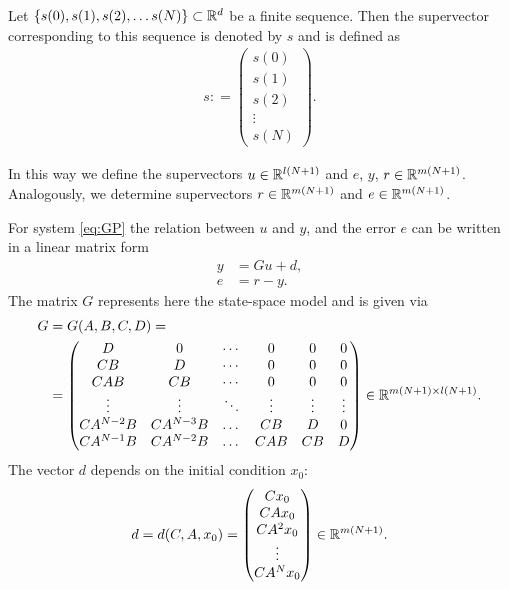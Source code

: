 \begin{defi}
	Let $\{s(0), s(1), s(2), \dots s(N)\} \subset {\mathbb{R}}^{d}$ be a finite sequence. Then the supervector corresponding to this sequence is denoted by $s$ and is defined as 
\begin{align}
s: = \begin{pmatrix}
s(0) \\ s(1) \\ s(2) \\ \vdots \\ s(N)
\end{pmatrix}.
\end{align}
\end{defi}

In this way we define the supervectors $u \in {\mathbb{R}}^{l(N+1)} $ and $e$, $y$, $r \in {\mathbb{R}}^{m(N+1)}$. 
Analogously, we determine supervectors $r\in {\mathbb{R}}^{m(N+1)}$ and $e\in {\mathbb{R}}^{m(N+1)}$. 

For system \eqref{eq:GP} the relation between $u$ and $y$, and the error $e$ can be written in a linear matrix form 
\begin{align}
\label{eq:Gu + d}
y &= Gu + d, \\
e &= r - y.
\end{align}
The matrix $G$ represents here the state-space model and is given via  
\begin{align}
\label{eq:Gmatrix}
\begin{split}
G &= G(A,B,C,D) = \\
&=  \begin{pmatrix}
D & 0 & \cdots & 0 & 0 & 0 \\
CB & D & \cdots & 0 & 0 & 0\\
CAB & CB & \cdots & 0 & 0 & 0\\
\vdots & \vdots & \ddots & \vdots  & \vdots & \vdots \\
CA^{N-2} B & CA^{N-3} B &\dots &CB & D& 0\\
CA^{N-1} B & CA^{N-2} B &\dots &CAB & CB& D\\
\end{pmatrix} \in {\mathbb{R}}^{m(N+1)\times l(N+1)}.
\end{split}
\end{align}
The vector $d$ depends on the initial condition $x_0$:
\begin{align}
d = d(C,A,x_0) = \begin{pmatrix}
C x_0 \\ CA x_0 \\ CA^2 x_0 \\ \vdots \\ CA^Nx_0
\end{pmatrix} \in {\mathbb{R}}^{m(N+1)}.
\end{align}

